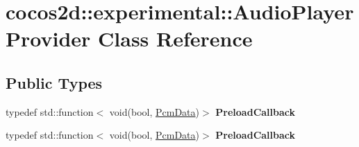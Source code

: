 \hypertarget{classcocos2d_1_1experimental_1_1AudioPlayerProvider}{}\section{cocos2d\+:\+:experimental\+:\+:Audio\+Player\+Provider Class Reference}
\label{classcocos2d_1_1experimental_1_1AudioPlayerProvider}
\subsection*{Public Types}
\begin{DoxyCompactItemize}
\item 
\mbox{\label{classcocos2d_1_1experimental_1_1AudioPlayerProvider_acad01da540ebee7c2e87169761469cb0}} 
typedef std\+::function$<$ void(bool, \hyperlink{structcocos2d_1_1experimental_1_1PcmData}{Pcm\+Data})$>$ {\bfseries Preload\+Callback}
\item 
\mbox{\label{classcocos2d_1_1experimental_1_1AudioPlayerProvider_acad01da540ebee7c2e87169761469cb0}} 
typedef std\+::function$<$ void(bool, \hyperlink{structcocos2d_1_1experimental_1_1PcmData}{Pcm\+Data})$>$ {\bfseries Preload\+Callback}
\end{DoxyCompactItemize}
